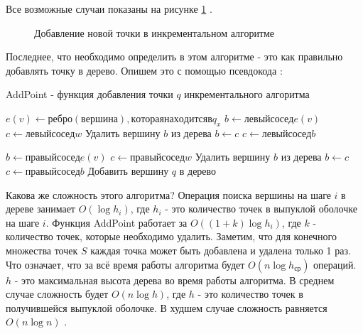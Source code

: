 Все возможные случаи показаны на рисунке \ref{img:incremental_newpoint} \cite{instructor2004incremental}.

\begin{figure}[H]
	{\centering
		\hfill
		\hfill
		\hfill
		\hfill
		\hfill
	}
	\caption{Добавление новой точки в инкрементальном алгоритме}
	\label{img:incremental_newpoint}
\end{figure}


Последнее, что необходимо определить в этом алгоритме - это как правильно добавлять точку в дерево. Опишем это с помощью псевдокода \cite{incremental2005presentation} \cite{instructor2004incremental}:

\begin{algorithm}[H]
	\caption{AddPoint - функция добавления точки $q$ инкрементального алгоритма}
	\label{alg:incremental_addpoint}
	\begin{algorithmic}[1]
		\State $e (v) \gets ребро (вершина), которая находится в q_x$
		\State $b \gets левый сосед e(v)$
		\State $c \gets левый сосед w$
			\State Удалить вершину $b$ из дерева
			\State $b \gets c$
			\State $c \gets левый сосед b$
		\EndWhile
		
		\State $b \gets правый сосед e(v)$
		\State $c \gets правый сосед w$
			\State Удалить вершину $b$ из дерева
			\State $b \gets c$
			\State $c \gets правый сосед b$
		\EndWhile
		\State Добавить вершину $q$ в дерево
		\EndProcedure
	\end{algorithmic}
\end{algorithm}

Какова же сложность этого алгоритма? Операция поиска вершины на шаге $i$ в дереве занимает $O(\log h_i)$, где $h_i$ - это количество точек в выпуклой оболочке на шаге $i$. Функция AddPoint работает за $O((1+k) \log h_i)$, где $k$ - количество точек, которые необходимо удалить. Заметим, что для конечного множества точек $S$ каждая точка может быть добавлена и удалена только 1 раз. Что означает, что за всё время работы алгоритма будет $O(n \log h_{ср})$ операций. $h$ - это максимальная высота дерева во время работы алгоритма. В среднем случае сложность будет $O(n \log h)$, где $h$ - это количество точек в получившейся выпуклой оболочке. В худшем случае сложность равняется $O(n \log n)$ \cite{instructor2004incremental}.

